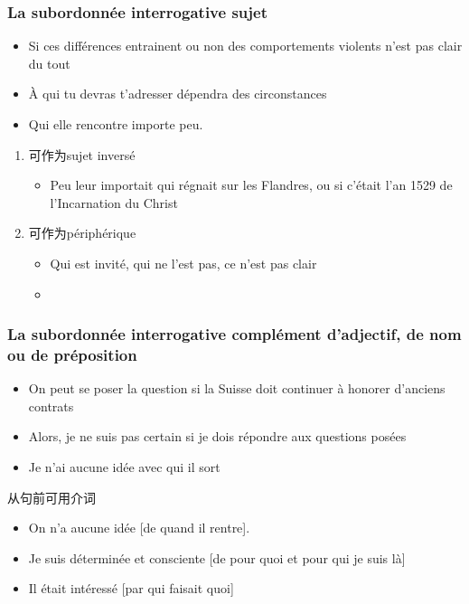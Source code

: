 \documentclass[UTF8]{report}
\begin{document}
\subsubsection{La subordonnée interrogative sujet}
\begin{itemize}
    \item Si ces différences entrainent ou non des comportements violents n’est pas clair du tout
    \item À qui tu devras t’adresser dépendra des circonstances
    \item Qui elle rencontre importe peu.
\end{itemize}
\begin{enumerate}
    \item 可作为sujet inversé
    \begin{itemize}
        \item Peu leur importait qui régnait sur les Flandres, ou si c’était l’an 1529 de l’Incarnation du Christ
    \end{itemize}
    \item 可作为périphérique
    \begin{itemize}
        \item Qui est invité, qui ne l’est pas, ce n’est pas clair
        \item 
    \end{itemize}
\end{enumerate}

\subsubsection{La subordonnée interrogative complément d’adjectif, de nom ou de préposition}

\begin{itemize}
    \item On peut se poser la question si la Suisse doit continuer à honorer d’anciens contrats
    \item Alors, je ne suis pas certain si je dois répondre aux questions posées
    \item Je n’ai aucune idée avec qui il sort
\end{itemize}
从句前可用介词
\begin{itemize}
    \item On n’a aucune idée [de quand il rentre].
    \item Je suis déterminée et consciente [de pour quoi et pour qui je suis là] 
    \item Il était intéressé [par qui faisait quoi]
\end{itemize}
\end{document}
